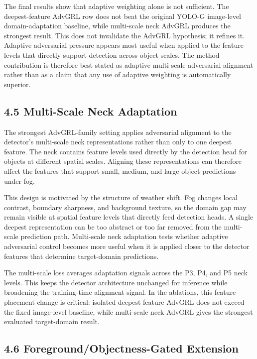\documentclass[
  11pt,
]{article}
\begin{document}
The final results show that adaptive weighting alone is not sufficient.
The deepest-feature AdvGRL row does not beat the original YOLO-G
image-level domain-adaptation baseline, while multi-scale neck AdvGRL
produces the strongest result. This does not invalidate the AdvGRL
hypothesis; it refines it. Adaptive adversarial pressure appears most
useful when applied to the feature levels that directly support
detection across object scales. The method contribution is therefore
best stated as adaptive multi-scale adversarial alignment rather than as
a claim that any use of adaptive weighting is automatically superior.

\hypertarget{multi-scale-neck-adaptation}{%
\subsection{4.5 Multi-Scale Neck
Adaptation}\label{multi-scale-neck-adaptation}}

The strongest AdvGRL-family setting applies adversarial alignment to the
detector's multi-scale neck representations rather than only to one
deepest feature. The neck contains feature levels used directly by the
detection head for objects at different spatial scales. Aligning these
representations can therefore affect the features that support small,
medium, and large object predictions under fog.

This design is motivated by the structure of weather shift. Fog changes
local contrast, boundary sharpness, and background texture, so the
domain gap may remain visible at spatial feature levels that directly
feed detection heads. A single deepest representation can be too
abstract or too far removed from the multi-scale prediction path.
Multi-scale neck adaptation tests whether adaptive adversarial control
becomes more useful when it is applied closer to the detector features
that determine target-domain predictions.

The multi-scale loss averages adaptation signals across the P3, P4, and
P5 neck levels. This keeps the detector architecture unchanged for
inference while broadening the training-time alignment signal. In the
ablations, this feature-placement change is critical: isolated
deepest-feature AdvGRL does not exceed the fixed image-level baseline,
while multi-scale neck AdvGRL gives the strongest evaluated
target-domain result.

\hypertarget{foregroundobjectness-gated-extension}{%
\subsection{4.6 Foreground/Objectness-Gated
Extension}\label{foregroundobjectness-gated-extension}}
\end{document}
